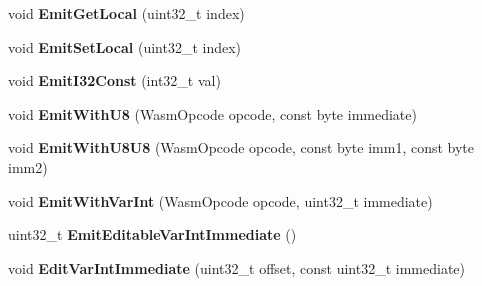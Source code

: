 \begin{DoxyCompactItemize}
\item 
void {\bfseries Emit\+Get\+Local} (uint32\+\_\+t index)\hypertarget{classv8_1_1internal_1_1wasm_1_1_wasm_function_builder_a2837891a191fa5640d4e7131a679fc17}{}\label{classv8_1_1internal_1_1wasm_1_1_wasm_function_builder_a2837891a191fa5640d4e7131a679fc17}

\item 
void {\bfseries Emit\+Set\+Local} (uint32\+\_\+t index)\hypertarget{classv8_1_1internal_1_1wasm_1_1_wasm_function_builder_a99c975f6dd584e2b09757f424dbf3785}{}\label{classv8_1_1internal_1_1wasm_1_1_wasm_function_builder_a99c975f6dd584e2b09757f424dbf3785}

\item 
void {\bfseries Emit\+I32\+Const} (int32\+\_\+t val)\hypertarget{classv8_1_1internal_1_1wasm_1_1_wasm_function_builder_acf4a6a63c931c0a63921d7c8da1c8791}{}\label{classv8_1_1internal_1_1wasm_1_1_wasm_function_builder_acf4a6a63c931c0a63921d7c8da1c8791}

\item 
void {\bfseries Emit\+With\+U8} (Wasm\+Opcode opcode, const byte immediate)\hypertarget{classv8_1_1internal_1_1wasm_1_1_wasm_function_builder_ab3a596820cd388c8ecc3a9ec9bfa4743}{}\label{classv8_1_1internal_1_1wasm_1_1_wasm_function_builder_ab3a596820cd388c8ecc3a9ec9bfa4743}

\item 
void {\bfseries Emit\+With\+U8\+U8} (Wasm\+Opcode opcode, const byte imm1, const byte imm2)\hypertarget{classv8_1_1internal_1_1wasm_1_1_wasm_function_builder_a7a40a246b07ac2317a5d20d07c50c501}{}\label{classv8_1_1internal_1_1wasm_1_1_wasm_function_builder_a7a40a246b07ac2317a5d20d07c50c501}

\item 
void {\bfseries Emit\+With\+Var\+Int} (Wasm\+Opcode opcode, uint32\+\_\+t immediate)\hypertarget{classv8_1_1internal_1_1wasm_1_1_wasm_function_builder_a85db7bdb69cc40009e1cf6b6e0980efa}{}\label{classv8_1_1internal_1_1wasm_1_1_wasm_function_builder_a85db7bdb69cc40009e1cf6b6e0980efa}

\item 
uint32\+\_\+t {\bfseries Emit\+Editable\+Var\+Int\+Immediate} ()\hypertarget{classv8_1_1internal_1_1wasm_1_1_wasm_function_builder_a466663a8c0b4c53fa93c515da673c245}{}\label{classv8_1_1internal_1_1wasm_1_1_wasm_function_builder_a466663a8c0b4c53fa93c515da673c245}

\item 
void {\bfseries Edit\+Var\+Int\+Immediate} (uint32\+\_\+t offset, const uint32\+\_\+t immediate)\hypertarget{classv8_1_1internal_1_1wasm_1_1_wasm_function_builder_abfad5e0ad3c91ea7e6a418c8a89150ff}{}\label{classv8_1_1internal_1_1wasm_1_1_wasm_function_builder_abfad5e0ad3c91ea7e6a418c8a89150ff}


\end{DoxyCompactItemize}
